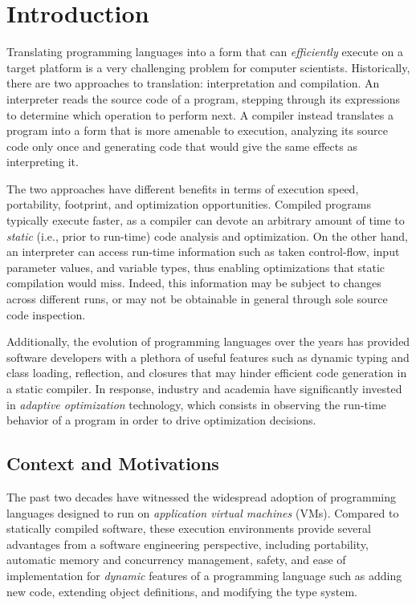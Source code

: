 \chapter{Introduction}

Translating programming languages into a form that can {\em efficiently} execute on a target platform is a very challenging problem for computer scientists. Historically, there are two approaches to translation: interpretation and compilation. An interpreter reads the source code of a program, stepping through its expressions to determine which operation to perform next. A compiler instead translates a program into a form that is more amenable to execution, analyzing its source code only once and generating code that would give the same effects as interpreting it.

The two approaches have different benefits in terms of execution speed, portability, footprint, and optimization opportunities. Compiled programs typically execute faster, as a compiler can devote an arbitrary amount of time to {\em static} (i.e., prior to run-time) code analysis and optimization. On the other hand, an interpreter can access run-time information such as taken control-flow, input parameter values, and variable types, thus enabling optimizations that static compilation would miss. Indeed, this information may be subject to changes across different runs, or may not be obtainable in general through sole source code inspection.

Additionally, the evolution of programming languages over the years has provided software developers with a plethora of useful features such as dynamic typing and class loading, reflection, and closures that may hinder efficient code generation in a static compiler. In response, industry and academia have significantly invested in {\em adaptive optimization} technology, which consists in observing the run-time behavior of a program in order to drive optimization decisions.


\section{Context and Motivations}

The past two decades have witnessed the widespread adoption of programming languages designed to run on {\em application virtual machines} (VMs). Compared to statically compiled software, these execution environments provide several advantages from a software engineering perspective, including portability, automatic memory and concurrency management, safety, and ease of implementation for {\em dynamic} features of a programming language such as adding new code, extending object definitions, and modifying the type system.

